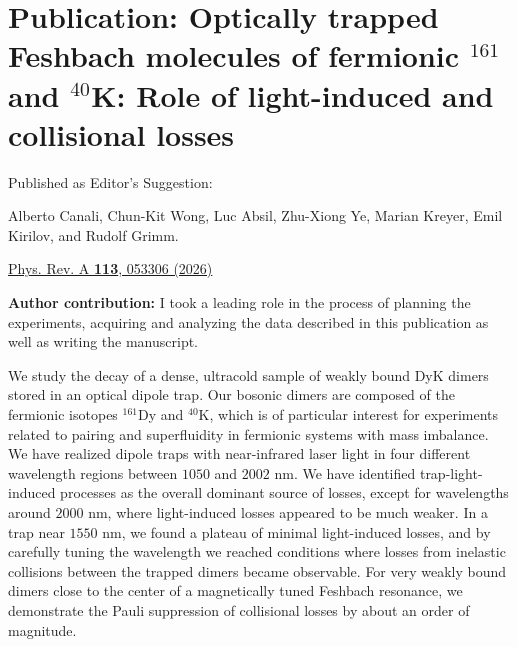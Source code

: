 \chapter{Publication: Optically trapped Feshbach molecules of fermionic $^{161}$\Dy\, and $^{40}$K: Role of light-induced and collisional losses}
\label{Chpt:MolLoss}



\begin{flushleft}
	\noindent
	{\Large Published as Editor's Suggestion:\linebreak}

	{\Large  Alberto Canali, Chun-Kit Wong, Luc Absil, Zhu-Xiong Ye, Marian Kreyer, Emil Kirilov, and Rudolf Grimm.\linebreak}
	
	{\Large\href{https://doi.org/10.1103/ftpc-qq4c}{Phys. Rev. A  \textbf{113}, 053306 (2026)}\linebreak}
	
	
	\vfill
	
	\noindent
	{\large \textbf{Author contribution:}}
	I took a leading role in the process of planning the experiments, acquiring and analyzing the data described in this publication as well as writing the manuscript. \linebreak
	\noindent
	
	
\end{flushleft}

\newpage
\begin{minipage}{10cm}
We study the decay of a dense, ultracold sample of weakly bound DyK dimers stored in an optical dipole trap.
Our bosonic dimers are composed of the fermionic isotopes $^{161}$Dy and $^{40}$K, which is of particular interest for experiments related to pairing and superfluidity in fermionic systems with mass imbalance.
We have realized dipole traps with near-infrared laser light in four different wavelength regions between $1050$ and $2002$ \unit{nm}. We have identified trap-light-induced processes as the overall dominant source of losses, except for wavelengths around $2000$ \unit{nm}, where light-induced losses appeared to be much weaker. In a trap near $1550$ \unit{nm}, we found a plateau of minimal light-induced losses, and by carefully tuning the wavelength we reached conditions where losses from inelastic collisions between the trapped dimers became observable. For very weakly bound dimers close to the center of a magnetically tuned Feshbach resonance, we demonstrate the Pauli suppression of collisional losses by about an order of magnitude.
\end{minipage}


